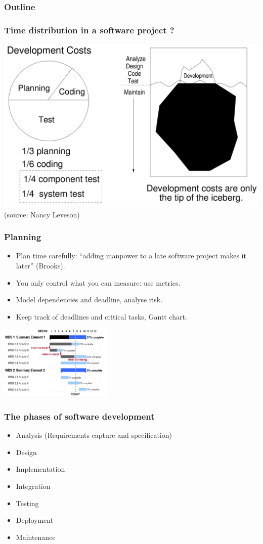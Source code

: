 \documentclass[10pt]{beamer}
\begin{document}
\begin{frame}
  \frametitle{Outline}
  \tableofcontents[currentsection]
\end{frame}

\begin{frame}[fragile]
  \frametitle{Time distribution in a software project ?}
  \includegraphics[width=\textwidth]{soft_cost}
  \tiny(source: Nancy Leveson)
\end{frame}

\begin{frame}[fragile]
  \frametitle{Planning}
  \begin{itemize}
  \item Plan time carefully: ``adding manpower to a late software project
    makes it later'' (Brooks).
  \item You only control what you can measure: use metrics.
  \item Model dependencies and deadline, analyse risk.
  \item Keep track of deadlines and critical tasks, Gantt chart.
  \end{itemize}
  \begin{center}
    \includegraphics[width=0.4\textwidth]{gantt_chart}
  \end{center}
\end{frame}

\begin{frame}[fragile]
  \frametitle{The phases of software development}
  \begin{itemize}
  \item Analysis (Requirements capture and specification)
  \item Design
  \item Implementation
  \item Integration
  \item Testing
  \item Deployment
  \item Maintenance
  \end{itemize}
\end{frame}
\end{document}
